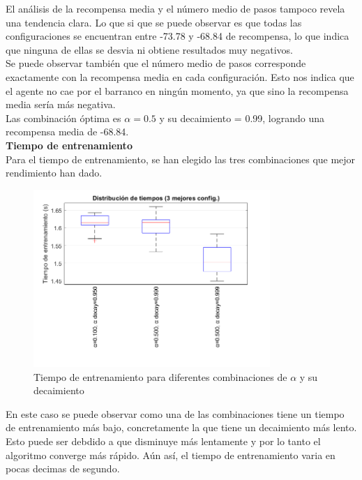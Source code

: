 El análisis de la recompensa media y el número medio de pasos tampoco revela una tendencia clara. Lo que si que se puede observar es que todas las configuraciones se encuentran entre -73.78 y -68.84 de recompensa, lo que indica que ninguna de ellas se desvia ni obtiene resultados muy negativos. 
\\

Se puede observar también que el número medio de pasos corresponde exactamente con la recompensa media en cada configuración. Esto nos indica que el agente no cae por el barranco en ningún momento, ya que sino la recompensa media sería más negativa.
\\

Las combinación óptima es $\alpha = 0.5$ y su decaimiento = 0.99, logrando una recompensa media de -68.84.
\\

\textbf{Tiempo de entrenamiento}
\\

Para el tiempo de entrenamiento, se han elegido las tres combinaciones que mejor rendimiento han dado. 

\begin{figure}[H]
    \centering
    \includegraphics[width=0.8\textwidth]{../../experiments/qlearning/experiment-3/results/time.png}
    \caption{Tiempo de entrenamiento para diferentes combinaciones de $\alpha$ y su decaimiento}
    \label{fig:qlearning-time}
\end{figure}

En este caso se puede observar como una de las combinaciones tiene un tiempo de entrenamiento más bajo, concretamente la que tiene un decaimiento más lento. Esto puede ser debdido a que \alpha disminuye más lentamente y por lo tanto el algoritmo converge más rápido. Aún así, el tiempo de entrenamiento varia en pocas decimas de segundo.
\\


